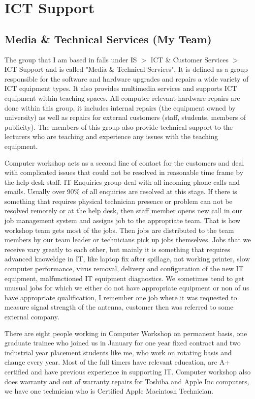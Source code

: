 \documentclass[10pt,a4paper,headinclude=true]{report}
\begin{document}
\section{ICT Support}
\subsection{Media \& Technical Services (My Team)}
The group that I am based in falls under IS $>$ ICT \& Customer Services $>$ ICT Support and is called "Media \& Technical Services". It is defined as a group responsible for the software and hardware upgrades and repairs a wide variety of ICT equipment types. It also provides multimedia services and supports ICT equipment within teaching spaces. All computer relevant hardware repairs are done within this group, it includes internal repairs (the equipment owned by university) as well as repairs for external customers (staff, students, members of publicity). The members of this group also provide technical support to the lecturers who are teaching and experience any issues with the teaching equipment. 

Computer workshop acts as a second line of contact for the customers and deal with complicated issues that could not be resolved in reasonable time frame by the help desk staff. IT Enquiries group deal with all incoming phone calls and emails. Usually over 90\% of all enquiries are resolved at this stage. If there is something that requires physical technician presence or problem can not be resolved remotely or at the help desk, then staff member opens new call in our job management system and assigns job to the appropriate team. That is how workshop team gets most of the jobs. Then jobs are distributed to the team members by our team leader or technicians pick up jobs themselves. Jobs that we receive vary greatly to each other, but mainly it is something that requires advanced knoweldge in IT, like laptop fix after spillage, not working printer, slow computer performance, virus removal, delivery and configuration of the new IT equipment, malfunctioned IT equipment diagnostics. We sometimes tend to get unusual jobs for which we either do not have appropriate equipment or non of us have appropriate qualification, I remember one job where it was requested to measure signal strength of the antenna, customer then was referred to some external company.

There are eight people working in Computer Workshop on permanent basis, one graduate trainee who joined us in January for one year fixed contract and two industrial year placement students like me, who work on rotating basis and change every year. Most of the full timers have relevant education, are A+ certified\cite{A+} and have previous experience in supporting IT. Computer workshop also does warranty and out of warranty repairs for Toshiba and Apple Inc computers, we have one technician who is Certified Apple Macintosh Technician. 
\end{document}
